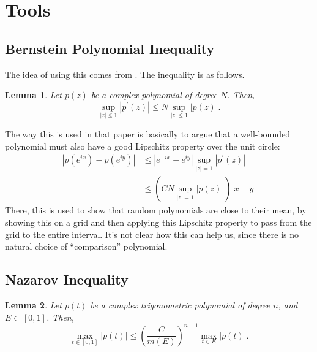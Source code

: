 \documentclass[11pt]{article}
\newtheorem{lemma}{Lemma}
\begin{document}
\clearpage

\section{Tools}

\subsection{Bernstein Polynomial Inequality}

The idea of using this comes from \cite{tang2013compressed}.
The inequality is as follows.

\begin{lemma}
    Let $p(z)$ be a complex polynomial of degree $N$.
    Then,
    \[ \sup_{|z| \leq 1} |p^\prime(z)| \leq N\sup_{|z| \leq 1}|p(z)|. \]
\end{lemma}
The way this is used in that paper is basically to argue that a well-bounded polynomial must also have a good Lipschitz property over the unit circle:
\begin{align*}
  |p(e^{ix}) - p(e^{iy})|
  &\leq |e^{-ix} - e^{iy}|\sup_{|z| = 1}|p^\prime(z)| \\
  &\leq \left(CN\sup_{|z| = 1}|p(z)|\right) |x - y|
\end{align*}
There, this is used to show that random polynomials are close to their mean, by showing this on a grid and then applying this Lipschitz property to pass from the grid to the entire interval.
It's not clear how this can help us, since there is no natural choice of ``comparison'' polynomial.

\subsection{Nazarov Inequality}

\begin{lemma}
    Let $p(t)$ be a complex trigonometric polynomial of degree $n$, and $E \subset [0, 1]$.
    Then,
    \[ \max_{t \in [0, 1]} |p(t)| \leq \left(\frac{C}{m(E)}\right)^{n - 1}\max_{t \in E}|p(t)|. \]
\end{lemma}



\end{document}
